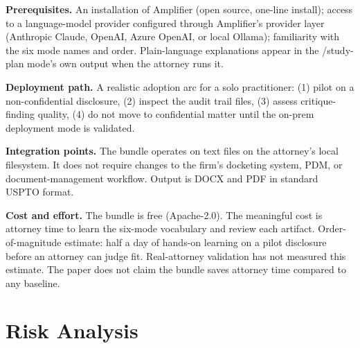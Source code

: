 \documentclass[11pt,letterpaper]{article}
\begin{document}
\textbf{Prerequisites.} An installation of Amplifier (open source,
one-line install); access to a language-model provider configured
through Amplifier's provider layer (Anthropic Claude, OpenAI, Azure
OpenAI, or local Ollama); familiarity with the six mode names and
order. Plain-language explanations appear in the /study-plan mode's
own output when the attorney runs it.

\textbf{Deployment path.} A realistic adoption arc for a solo
practitioner: (1) pilot on a non-confidential disclosure, (2) inspect
the audit trail files, (3) assess critique-finding quality, (4) do
not move to confidential matter until the on-prem deployment mode is
validated.

\textbf{Integration points.} The bundle operates on text files on
the attorney's local filesystem. It does not require changes to the
firm's docketing system, PDM, or document-management workflow.
Output is DOCX and PDF in standard USPTO format.

\textbf{Cost and effort.} The bundle is free (Apache-2.0). The
meaningful cost is attorney time to learn the six-mode vocabulary
and review each artifact. Order-of-magnitude estimate: half a day of
hands-on learning on a pilot disclosure before an attorney can judge
fit. Real-attorney validation has not measured this estimate. The
paper does not claim the bundle saves attorney time compared to any
baseline.

\section{Risk Analysis}
\end{document}
